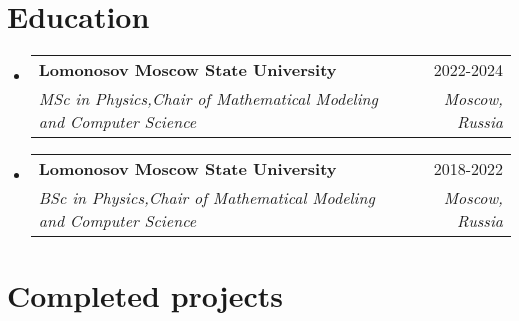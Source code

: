 \documentclass[a4paper,11pt]{article}
\makeatletter
\newcommand{\resumeItem}[1]{
  \item\small{#1}
}
\newcommand{\resumeItemListStart}{\begin{itemize}[rightmargin=0.11in]}
\newcommand{\resumeItemListEnd}{\end{itemize}}
\newcommand{\resumeQuadHeading}[4]{
  \item
  \begin{tabular*}{0.96\textwidth}[t]{l@{\extracolsep{\fill}}r}
    \textbf{#1} & #2 \\
    \textit{\small#3} & \textit{\small #4} \\
  \end{tabular*}
}
\newcommand{\resumeQuadHeadingChild}[2]{
  \item
  \begin{tabular*}{0.96\textwidth}[t]{l@{\extracolsep{\fill}}r}
    \textbf{\small#1} & {\small#2} \\
  \end{tabular*}
}
\newcommand{\resumeHeadingListStart}{
  \begin{itemize}[leftmargin=0.15in, label={}]
}
\newcommand{\resumeHeadingListEnd}{\end{itemize}}
\makeatother
\begin{document}





\section{Education}
  \resumeHeadingListStart{}
  
    \resumeQuadHeading{Lomonosov Moscow State University}{2022-2024}
    {MSc in Physics,Chair of Mathematical Modeling and Computer Science}{Moscow, Russia}

    \resumeQuadHeading{Lomonosov Moscow State University}{2018-2022}
    {BSc in Physics,Chair of Mathematical Modeling and Computer Science}{Moscow, Russia}

  \resumeHeadingListEnd{}




\section{Completed projects}
\end{document}
